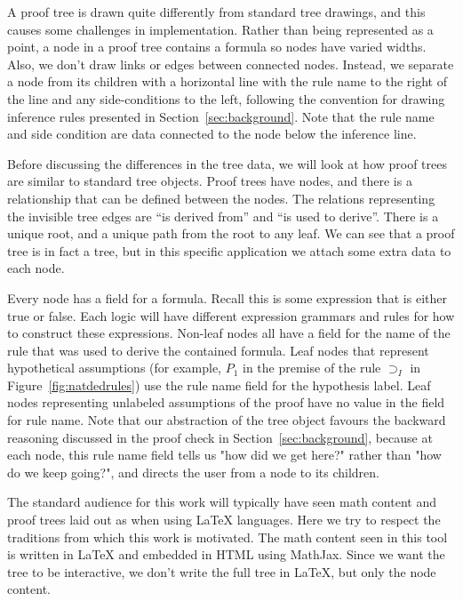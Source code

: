 \documentclass[journal]{vgtc}                %
\begin{document}
A proof tree is drawn quite differently from standard tree drawings, and this causes some challenges in implementation. Rather than being represented as a point, a node in a proof tree contains a formula so nodes have varied widths. Also, we don't draw links or edges between connected nodes. Instead, we separate a node from its children with a horizontal line with the rule name to the right of the line and any side-conditions to the left, following the convention for drawing inference rules presented in Section~\ref{sec:background}. Note that the rule name and side condition are data connected to the node below the inference line.

Before discussing the differences in the tree data, we will look at how proof trees are similar to standard tree objects. Proof trees have nodes, and there is a relationship that can be defined between the nodes. The relations representing the invisible tree edges are ``is derived from'' and ``is used to derive''. There is a unique root, and a unique path from the root to any leaf. We can see that a proof tree is in fact a tree, but in this specific application we attach some extra data to each node.

Every node has a field for a formula. Recall this is some expression that is either true or false. Each logic will have different expression grammars and rules for how to construct these expressions. Non-leaf nodes all have a field for the name of the rule that was used to derive the contained formula. Leaf nodes that represent hypothetical assumptions (for example, $P_1$ in the premise of the rule $\supset_I$ in Figure~\ref{fig:natdedrules}) use the rule name field for the hypothesis label. Leaf nodes representing unlabeled assumptions of the proof have no value in the field for rule name. Note that our abstraction of the tree object favours the backward reasoning discussed in the proof check in Section~\ref{sec:background}, because at each node, this rule name field tells us "how did we get here?" rather than "how do we keep going?", and directs the user from a node to its children.

The standard audience for this work will typically have seen math content and proof trees laid out as when using \LaTeX{} languages. Here we try to respect the traditions from which this work is motivated. The math content seen in this tool is written in \LaTeX{} and embedded in HTML using MathJax. Since we want the tree to be interactive, we don't write the full tree in \LaTeX{}, but only the node content.
\end{document}
